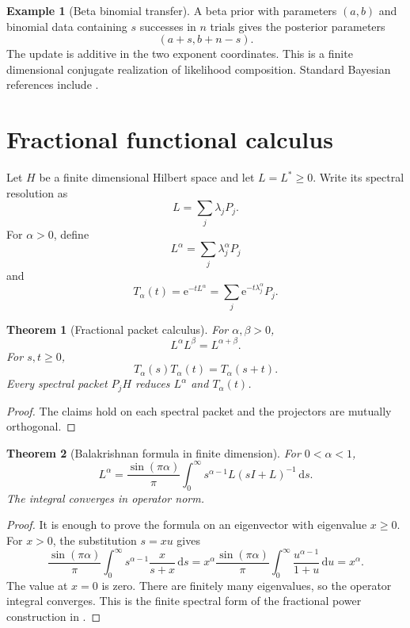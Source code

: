 \documentclass[11pt,letterpaper]{article}
\newtheorem{theorem}{Theorem}[section]
\theoremstyle{plain}
\theoremstyle{plain}
\theoremstyle{plain}
\theoremstyle{definition}
\theoremstyle{definition}
\theoremstyle{definition}
\newtheorem{example}[example]{Example}
\theoremstyle{definition}
\theoremstyle{definition}
\theoremstyle{remark}
\theoremstyle{remark}
\theoremstyle{remark}
\theoremstyle{remark}
\theoremstyle{remark}
\theoremstyle{remark}
\newcommand{\e}{\mathrm e}
\newcommand{\dd}{\,\mathrm d}
\let\KomorebiPrimitivemathrm\mathrm
\renewcommand{\mathrm}[1]{{\KomorebiPrimitivemathrm{#1}}}
\begin{document}
\begin{example}[Beta binomial transfer]\label{extended:record:066}
A beta prior with parameters \((a,b)\) and binomial data containing \(s\) successes in \(n\) trials gives the posterior parameters
\[
(a+s,b+n-s).
\]
The update is additive in the two exponent coordinates. This is a finite dimensional conjugate realization of likelihood composition. Standard Bayesian references include \cite{BernardoSmith1994}.
\end{example}

\FloatBarrier
\section{Fractional functional calculus}\label{extended:section:11}\label{extended:sec:fractional}

Let \(H\) be a finite dimensional Hilbert space and let \(L=L^*\geq0\). Write its spectral resolution as
\[
L=\sum_j\lambda_jP_j.
\]
For \(\alpha>0\), define
\[
L^\alpha
=
\sum_j\lambda_j^\alpha P_j
\]
and
\[
T_\alpha(t)
=
\e^{-tL^\alpha}
=
\sum_j\e^{-t\lambda_j^\alpha}P_j.
\]

\begin{theorem}[Fractional packet calculus]\label{extended:record:067}\label{extended:thm:fractional_packet_calculus}
For \(\alpha,\beta>0\),
\[
L^\alpha L^\beta=L^{\alpha+\beta}.
\]
For \(s,t\geq0\),
\[
T_\alpha(s)T_\alpha(t)=T_\alpha(s+t).
\]
Every spectral packet \(P_jH\) reduces \(L^\alpha\) and \(T_\alpha(t)\).
\end{theorem}

\begin{proof}
The claims hold on each spectral packet and the projectors are mutually orthogonal.
\end{proof}

\begin{theorem}[Balakrishnan formula in finite dimension]\label{extended:record:068}\label{extended:thm:balakrishnan}
For \(0<\alpha<1\),
\[
L^\alpha
=
\frac{\sin(\pi\alpha)}{\pi}
\int_0^\infty
s^{\alpha-1}L(sI+L)^{-1}
\dd s.
\]
The integral converges in operator norm.
\end{theorem}

\begin{proof}
It is enough to prove the formula on an eigenvector with eigenvalue \(x\geq0\). For \(x>0\), the substitution \(s=xu\) gives
\[
\frac{\sin(\pi\alpha)}{\pi}
\int_0^\infty
s^{\alpha-1}\frac{x}{s+x}\dd s
=x^\alpha
\frac{\sin(\pi\alpha)}{\pi}
\int_0^\infty\frac{u^{\alpha-1}}{1+u}\dd u
=x^\alpha.
\]
The value at \(x=0\) is zero. There are finitely many eigenvalues, so the operator integral converges. This is the finite spectral form of the fractional power construction in \cite{Balakrishnan1960}.
\end{proof}
\end{document}
